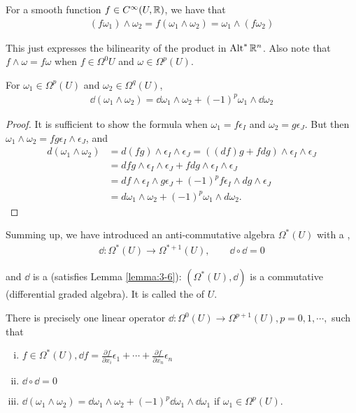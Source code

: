 For a smooth function $f\in C^\infty(U, \mathbb{R})$, we have that
\begin{align*}
  (f\omega_1)\wedge\omega_2 = f(\omega_1\wedge\omega_2) = \omega_1\wedge(f\omega_2)
\end{align*}

This just expresses the bilinearity of the product in $\operatorname{Alt}^{*}\mathbb{R}^n$. Also note that 
$f\wedge\omega = f\omega$ when $f\in\Omega^0{U}$ and $\omega\in\Omega^p(U)$.

\begin{lemma}\label{lemma:3-6}
For $\omega_1\in\Omega^p(U)$ and $\omega_2\in\Omega^q(U)$,
\begin{align*}
  \dd(\omega_1\wedge\omega_2) = \dd\omega_1\wedge\omega_2 + (-1)^p\omega_1\wedge\dd\omega_2
\end{align*}
\end{lemma}

\begin{proof}
  It is sufficient to show the formula when $\omega_1=f\epsilon_I$ and $\omega_2=g\epsilon_J$. But 
  then $\omega_1\wedge\omega_2 = fg\epsilon_I\wedge\epsilon_J$, and 
  \begin{align*}
    d(\omega_1\wedge\omega_2) 
    & = d(fg)\wedge\epsilon_{I}\wedge\epsilon_{J}=((df)g+fdg)\wedge\epsilon_{I}\wedge\epsilon_{J} \\
    & = dfg\wedge\epsilon_{I}\wedge\epsilon_{J}+fdg\wedge\epsilon_{I}\wedge\epsilon_{J} \\
    & = df\wedge\epsilon_{I}\wedge g\epsilon_{J}+(-1)^{p}f\epsilon_{I}\wedge dg\wedge\epsilon_{J} \\
    & = d\omega_{1}\wedge\omega_{2}+(-1)^{p}\omega_{1}\wedge d\omega_{2}. 
  \end{align*}
\end{proof}

Summing up, we have introduced an anti-commutative algebra $\Omega^*(U)$ with a ,
\begin{align*}
  \dd:\Omega^*(U)\to\Omega^{*+1}(U), \qquad \dd\circ\dd = 0
\end{align*}

and $\dd$ is a  (satisfies Lemma \ref{lemma:3-6}): $(\Omega^*(U), \dd)$ is a commutative 
(differential graded algebra). It is called the  of $U$.

\begin{theorem}\label{theorem:3-7}
There is precisely one linear operator $\dd:\Omega^0(U)\to\Omega^{p+1}(U), p = 0,1, \cdots,$ such that  
\begin{enumerate}[(i)]
  \item $f\in\Omega^*(U), \dd f = \frac{\partial f }{\partial x_i }\epsilon_1 + \cdots + \frac{\partial f}{\partial x_n}\epsilon_n$
  \item $\dd\circ\dd = 0$
  \item $\dd(\omega_1\wedge\omega_2) = \dd\omega_1\wedge\omega_2 + (-1)^p\dd\omega_1\wedge\dd\omega_1$ if $\omega_1\in\Omega^p(U)$.
\end{enumerate}
\end{theorem}

